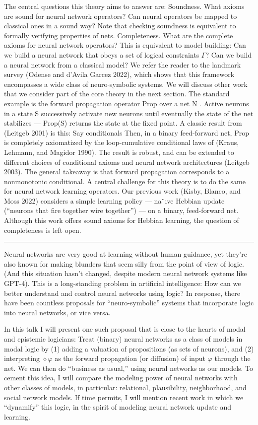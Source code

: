 \documentclass[letterpaper]{article}
\begin{document}
The central questions this theory aims to answer are:
Soundness. What axioms are sound for neural network operators? Can neural operators be mapped to classical ones in
a sound way? Note that checking soundness is equivalent
to formally verifying properties of nets.
Completeness. What are the complete axioms for neural
network operators? This is equivalent to model building:
Can we build a neural network that obeys a set of logical constraints $\Gamma$? Can we build a neural network from a
classical model?
We refer the reader to the landmark survey (Odense and
d’Avila Garcez 2022), which shows that this framework encompasses a wide class of neuro-symbolic systems. We will
discuss other work that we consider part of the core theory in
the next section.
The standard example is the forward propagation operator
Prop over a net N . Active neurons in a state S successively
activate new neurons until eventually the state of the net
stabilizes — Prop(S) returns the state at the fixed point. A
classic result from (Leitgeb 2001) is this: Say conditionals
Then, in a binary feed-forward net, Prop is completely axiomatized by the loop-cumulative conditional laws of (Kraus,
Lehmann, and Magidor 1990). The result is robust, and can
be extended to different choices of conditional axioms and
neural network architectures (Leitgeb 2003). The general
takeaway is that forward propagation corresponds to a nonmonotonic conditional.
A central challenge for this theory is to do the same for
neural network learning operators. Our previous work (Kisby,
Blanco, and Moss 2022) considers a simple learning policy
— na¨ıve Hebbian update (“neurons that fire together wire
together”) — on a binary, feed-forward net. Although this
work offers sound axioms for Hebbian learning, the question
of completeness is left open.

\hrule

Neural networks are very good at learning without human guidance, yet they’re also known for making blunders that seem silly from the point of view of logic. (And this situation hasn’t changed, despite modern neural network systems like GPT-4). This is a long-standing problem in artificial intelligence: How can we better understand and control neural networks using logic? In response, there have been countless proposals for “neuro-symbolic” systems that incorporate logic into neural networks, or vice versa.

In this talk I will present one such proposal that is close to the hearts of modal and epistemic logicians: Treat (binary) neural networks as a class of models in modal logic by (1) adding a valuation of propositions (as sets of neurons), and (2) interpreting $\diamond \varphi$ as the forward propagation (or diffusion) of input $\varphi$ through the net. We can then do “business as usual,” using neural networks as our models. To cement this idea, I will compare the modeling power of neural networks with other classes of models, in particular: relational, plausibility, neighborhood, and social network models. If time permits, I will mention recent work in which we “dynamify” this logic, in the spirit of modeling neural network update and learning.
\end{document}

